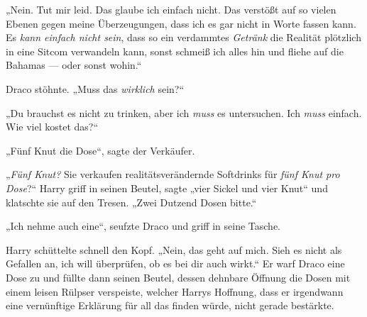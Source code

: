 „Nein. Tut mir leid. Das glaube ich einfach nicht. Das verstößt auf so vielen Ebenen gegen meine Überzeugungen, dass ich es gar nicht in Worte fassen kann. Es \emph{kann einfach nicht sein}, dass so ein verdammtes \emph{Getränk} die Realität plötzlich in eine Sitcom verwandeln kann, sonst schmeiß ich alles hin und fliehe auf die Bahamas — oder sonst wohin.“

Draco stöhnte.
„Muss das \emph{wirklich} sein?“

„Du brauchst es nicht zu trinken, aber ich \emph{muss} es untersuchen. Ich \emph{muss} einfach. Wie viel kostet das?“

„Fünf Knut die Dose“, sagte der Verkäufer.

„\emph{Fünf Knut?} Sie verkaufen realitätsverändernde Softdrinks für \emph{fünf Knut pro Dose}?“ Harry griff in seinen Beutel, sagte „vier Sickel und vier Knut“ und klatschte sie auf den Tresen.
„Zwei Dutzend Dosen bitte.“

„Ich nehme auch eine“, seufzte Draco und griff in seine Tasche.

Harry schüttelte schnell den Kopf.
„Nein, das geht auf mich. Sieh es nicht als Gefallen an, ich will überprüfen, ob es bei dir auch wirkt.“ Er warf Draco eine Dose zu und füllte dann seinen Beutel, dessen dehnbare Öffnung die Dosen mit einem leisen Rülpser verspeiste, welcher Harrys Hoffnung, dass er irgendwann eine vernünftige Erklärung für all das finden würde, nicht gerade bestärkte.


